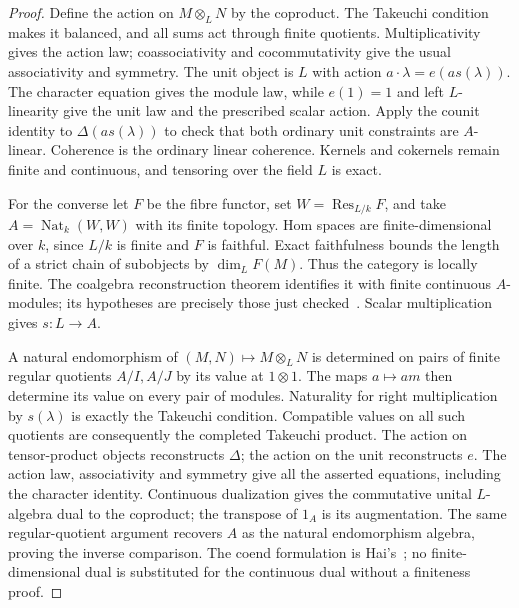 \begin{proof}
Define the action on $M\otimes_LN$ by the coproduct. The Takeuchi
condition makes it balanced, and all sums act through finite
quotients. Multiplicativity gives the action law; coassociativity
and cocommutativity give the usual associativity and symmetry.
The unit object is $L$ with action
$a\cdot\lambda=e(a s(\lambda))$. The character equation gives
the module law, while $e(1)=1$ and left $L$-linearity give the
unit law and the prescribed scalar action. Apply the counit
identity to $\Delta(a s(\lambda))$ to check that both ordinary
unit constraints are $A$-linear. Coherence is the ordinary linear
coherence. Kernels and cokernels remain finite and continuous,
and tensoring over the field $L$ is exact.

For the converse let $F$ be the fibre functor, set
$W=\operatorname{Res}_{L/k}F$, and take
$A=\operatorname{Nat}_k(W,W)$ with its finite topology. Hom spaces
are finite-dimensional over $k$, since $L/k$ is finite and $F$ is
faithful. Exact faithfulness bounds the length of a strict chain
of subobjects by $\dim_LF(M)$. Thus the category is locally finite.
The coalgebra reconstruction theorem identifies it with finite
continuous $A$-modules; its hypotheses are precisely those just
checked~\cite[6.1--6.2]{Deligne1990}\cite[Theorem~2.1.2]{Hai2008}.
Scalar multiplication gives $s:L\to A$.

A natural endomorphism of $(M,N)\mapsto M\otimes_LN$ is determined
on pairs of finite regular quotients $A/I,A/J$ by its value at
$1\otimes1$. The maps $a\mapsto am$ then determine its value on
every pair of modules. Naturality for right multiplication by
$s(\lambda)$ is exactly the Takeuchi condition. Compatible values
on all such quotients are consequently the completed Takeuchi
product. The action on tensor-product objects reconstructs
$\Delta$; the action on the unit reconstructs $e$. The action law,
associativity and symmetry give all the asserted equations,
including the character identity. Continuous dualization gives
the commutative unital $L$-algebra dual to the coproduct; the
transpose of $1_A$ is its augmentation. The same regular-quotient
argument recovers $A$ as the natural endomorphism algebra, proving
the inverse comparison. The coend formulation is
Hai's~\cite[Corollary~2.2.5]{Hai2008}; no finite-dimensional dual
is substituted for the continuous dual without a finiteness proof.
\end{proof}


